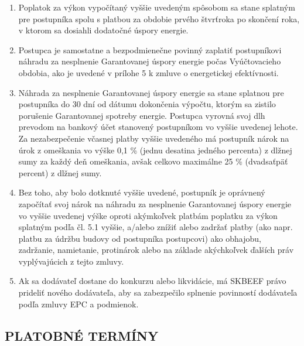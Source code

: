 \documentclass[a4paper]{article}
\begin{document}
\begin{enumerate}
    \item {Poplatok za výkon vypočítaný vyššie uvedeným spôsobom sa stane splatným pre postupníka spolu s platbou za obdobie prvého štvrťroka po skončení roka, v ktorom sa dosiahli dodatočné úspory energie.}
    \item {Postupca je samostatne a bezpodmienečne povinný zaplatiť postupníkovi náhradu za nesplnenie Garantovanej úspory energie počas Vyúčtovacieho obdobia, ako je uvedené v prílohe 5 k zmluve o energetickej efektívnosti.}
    \item {Náhrada za nesplnenie Garantovanej úspory energie sa stane splatnou pre postupníka do 30 dní od dátumu dokončenia výpočtu, ktorým sa zistilo porušenie Garantovanej spotreby energie. Postupca vyrovná svoj dlh prevodom na bankový účet stanovený postupníkom vo vyššie uvedenej lehote. Za nezabezpečenie včasnej platby vyššie uvedeného má postupník nárok na úrok z omeškania vo výške 0,1 \% (jednu desatina jedného percenta) z dlžnej sumy za každý deň omeškania, avšak celkovo maximálne 25 \% (dvadsaťpäť percent) z dlžnej sumy.}
    \item {Bez toho, aby bolo dotknuté vyššie uvedené, postupník je oprávnený započítať svoj nárok na náhradu za nesplnenie Garantovanej úspory energie vo vyššie uvedenej výške oproti akýmkoľvek platbám poplatku za výkon splatným podľa čl. 5.1 vyššie, a/alebo znížiť alebo zadržať platby (ako napr. platbu za údržbu budovy od postupníka postupcovi) ako obhajobu, zadržanie, namietanie, protinárok alebo na základe akýchkoľvek ďalších práv vyplývajúcich z tejto zmluvy.}
    \item {Ak sa dodávateľ dostane do konkurzu alebo likvidácie, má SKBEEF právo prideliť nového dodávateľa, aby sa zabezpečilo splnenie povinností dodávateľa podľa zmluvy EPC a podmienok.}
    
\end{enumerate}

\subsection{PLATOBNÉ TERMÍNY}
\end{document}
